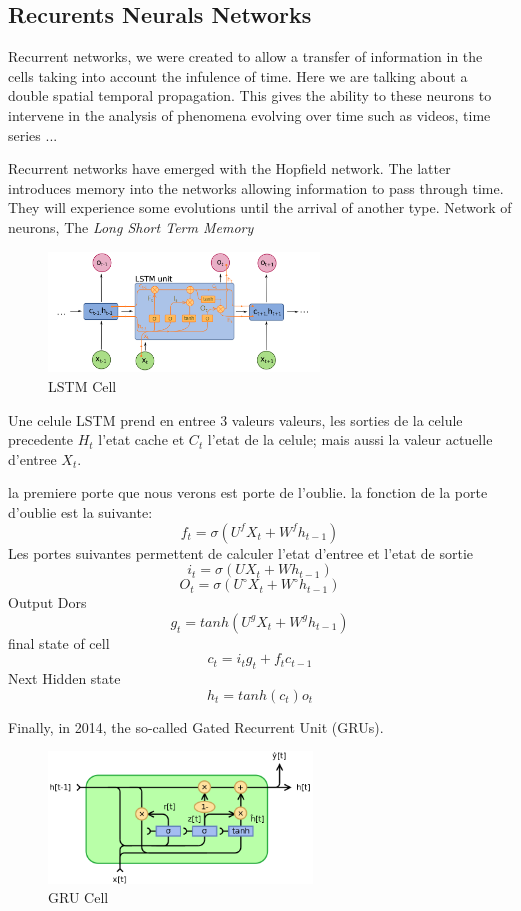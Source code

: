 \documentclass[twoside,twocolumn]{article}
\begin{document}
\subsection{Recurents Neurals Networks}

Recurrent networks, we were created to allow a transfer of information in the cells taking into account the infulence of time.
Here we are talking about a double spatial temporal propagation. This gives the ability to these neurons to intervene in the analysis of phenomena evolving over 
time such as videos, time series ...

Recurrent networks have emerged with the Hopfield \cite{Hopfield} network. The latter introduces memory into the networks allowing information to pass through 
time. They will experience some evolutions until the arrival of another type. Network of neurons, The \textit{Long Short Term Memory} \cite{lstm1}

\begin{figure}[h]
  \centering
  \includegraphics[width=72mm]{Long_Short-Term_Memory.png}
  \caption{LSTM Cell}
  \label{lstm}
\end{figure}

Une celule LSTM prend en entree 3 valeurs valeurs, les sorties de la celule precedente $H_t$ l'etat cache et $C_t$ l'etat de la celule; mais aussi la valeur actuelle d'entree $X_t$. 

la premiere porte que nous verons est porte de l'oublie. la fonction de la porte d'oublie est la suivante:
\[f_t = \sigma(U^fX_t + W^fh_{t-1})\]
Les portes suivantes permettent de calculer l'etat d'entree et l'etat de sortie
\[i_t = \sigma(UX_t + Wh_{t-1})\]
\[O_t = \sigma(U^{\circ}X_t + W^{\circ}h_{t-1})\]
Output Dors
\[g_t = tanh(U^gX_t + W^gh_{t-1})\]
final state of cell
\[c_t = i_tg_t + f_tc_{t-1}\]
Next Hidden state
\[h_t = tanh(c_t)o_t\]

Finally, in 2014, the so-called Gated Recurrent Unit (GRUs)\cite{cho2014learning}. 

\begin{figure}[h]
  \centering
  \includegraphics[width=70mm]{GRU.png}
  \caption{GRU Cell}
  \label{GRUs}
\end{figure}
\end{document}
